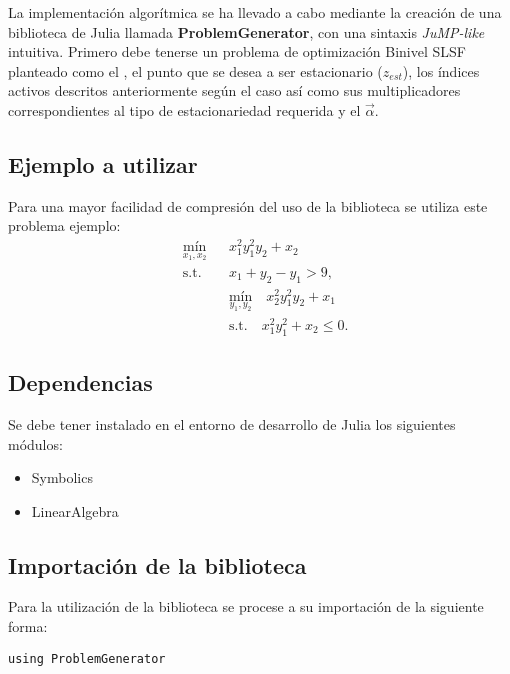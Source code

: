 La implementación algorítmica se ha llevado a cabo mediante la creación de una biblioteca de Julia
llamada \textbf{ProblemGenerator}, con una sintaxis \textit{JuMP-like} intuitiva.
Primero debe tenerse un problema de optimización Binivel SLSF planteado como el , el punto que se desea a ser estacionario ($z_{est}$), los índices activos descritos anteriormente 
según el caso así como sus multiplicadores correspondientes al tipo de estacionariedad requerida y el $\vec{\alpha}$.

\subsection{Ejemplo a utilizar}
Para una mayor facilidad de compresión del uso de la biblioteca se utiliza este problema ejemplo:
\begin{equation}
    \begin{aligned}
        & \underset{x_1, x_2}{\text{mín}} 
        && x_1^2 y_1^2 y_2 + x_2 \\
        & \text{s.t.} 
        && x_1 + y_2 - y_1 > 9, \\
        & 
        && \underset{y_1, y_2}{\text{mín}} 
        \quad x_2^2 y_1^2 y_2 + x_1 \\
        & 
        && \text{s.t.} 
        \quad x_1^2 y_1^2 + x_2 \leq 0.
    \end{aligned}
    \label{ProblemaEjemplo}
\end{equation}
\subsection{Dependencias}
Se debe tener instalado en el entorno de desarrollo de Julia los siguientes módulos:
\begin{itemize}
    \item Symbolics 
    \item LinearAlgebra
\end{itemize}

\subsection{Importación de la biblioteca}
Para la utilización de la biblioteca se procese a su importación de la siguiente forma:
\begin{lstlisting}[caption=Importar el Módulo]
    using ProblemGenerator
\end{lstlisting}

